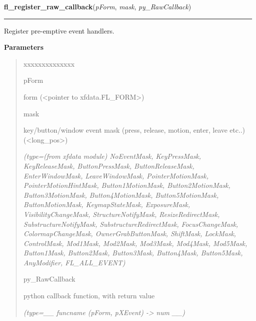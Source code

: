 \hspace{.8\funcindent}\begin{boxedminipage}{\funcwidth}

    \raggedright \textbf{fl\_register\_raw\_callback}(\textit{pForm}, \textit{mask}, \textit{py\_RawCallback})

    \vspace{-1.5ex}

    \rule{\textwidth}{0.5\fboxrule}
\setlength{\parskip}{2ex}
    Register pre-emptive event handlers.

\setlength{\parskip}{1ex}
      \textbf{Parameters}
      \vspace{-1ex}

      \begin{quote}
        \begin{Ventry}{xxxxxxxxxxxxxx}

          \item[pForm]

          form ({\textless}pointer to xfdata.FL\_FORM{\textgreater})

          \item[mask]

          key/button/window event mask (press, release, motion, enter, 
          leave etc..) ({\textless}long\_pos{\textgreater})

            {\it (type=(from xfdata module) NoEventMask, KeyPressMask, KeyReleaseMask, 
ButtonPressMask, ButtonReleaseMask, EnterWindowMask, LeaveWindowMask, 
PointerMotionMask, PointerMotionHintMask, Button1MotionMask, 
Button2MotionMask, Button3MotionMask, Button4MotionMask, Button5MotionMask,
ButtonMotionMask, KeymapStateMask, ExposureMask, VisibilityChangeMask, 
StructureNotifyMask, ResizeRedirectMask, SubstructureNotifyMask, 
SubstructureRedirectMask, FocusChangeMask, ColormapChangeMask, 
OwnerGrabButtonMask, ShiftMask, LockMask, ControlMask, Mod1Mask, Mod2Mask, 
Mod3Mask, Mod4Mask, Mod5Mask, Button1Mask, Button2Mask, Button3Mask, 
Button4Mask, Button5Mask, AnyModifier, FL\_ALL\_EVENT)}

          \item[py\_RawCallback]

          python callback function, with return value

            {\it (type=\_\_ funcname (pForm, pXEvent) -{\textgreater} num \_\_)}

        \end{Ventry}

      \end{quote}


\end{boxedminipage}
